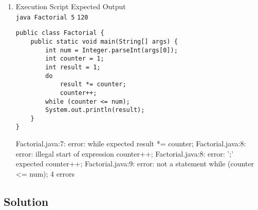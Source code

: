 \documentclass[12pt,letterpaper,twoside]{article}
\begin{document}
\begin{enumerate}[label=\textbf{(\alph*)}]
\begin{lstlisting}
public class SphereSurface {
	public static void main(String[] args) {
		double radius = Double.parseDouble(args[0]);
		double surface = 4 * Math.PI * pow(radius, 2);
		System.out.printf("%.2f\n", surface);
	}
}
\end{lstlisting}

\begin{terminal}
SphereSurface.java:4: error: cannot find symbol
        double surface = 4 * Math.PI * pow(radius, 2);
1 error
\end{terminal}

\newpage

\item Execution Script \hfill Expected Output\\
\texttt{java Factorial 5} \hfill \texttt{120}

\begin{lstlisting}
public class Factorial {
	public static void main(String[] args) {
		int num = Integer.parseInt(args[0]);
		int counter = 1;
		int result = 1;
		do
			result *= counter;
			counter++;
		while (counter <= num);
		System.out.println(result);
	}
}
\end{lstlisting}

\begin{terminal}
Factorial.java:7: error: while expected
	result *= counter;
Factorial.java:8: error: illegal start of expression
	counter++;
Factorial.java:8: error: ';' expected
	counter++;
Factorial.java:9: error: not a statement
	while (counter <= num);
4 errors
\end{terminal}

\end{enumerate}

\newpage

\subsection*{Solution}
\end{document}
